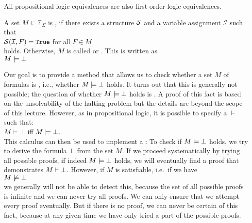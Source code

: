 \remarkEng
All propositional logic equivalences are also first-order logic equivalences.
\eox

\begin{Definition}[Satisfiable]
    A set $M \subseteq \mathbb{F}_\Sigma$ is ,
    if there exists a structure $\mathcal{S}$ and a variable assignment $\mathcal{I}$ such that 
    \\[0.2cm]
    \hspace*{1.3cm}
    $\mathcal{S}(\mathcal{I},F) = \mathtt{True}$ \quad for all $F \in M$ 
    \\[0.2cm]
    holds. Otherwise, $M$ is called  or .
    This is written as \\[0.2cm]
    \hspace*{1.3cm} $M \models \bot$ 
    \eox
\end{Definition}

\noindent
Our goal is to provide a method that allows us to check
whether a set $M$ of formulas is , i.e., whether 
$M \models \bot$ holds. It turns out that this is generally not
possible; the question of whether $M \models \bot$ holds is . A proof
of this fact is based on the unsolvability of the halting problem but the details are beyond the scope of
this lecture. 
However, as in propositional logic, it is possible
to specify a  $\vdash$ such that: \\[0.2cm]
\hspace*{1.3cm} $M \vdash \bot$ \quad iff \quad $M \models \bot$. \\[0.2cm]
This calculus can then be used to implement a
: To check if
$M \models \bot$ holds, we try to derive the formula $\bot$
from the set $M$.
If we proceed systematically by trying all possible proofs,
if indeed $M \models \bot$ holds, we will eventually find a proof
that demonstrates $M \vdash \bot$. However, if $M$ is satisfiable, i.e.~if we have  \\[0.2cm]
\hspace*{1.3cm}  $M \not\models \bot$ \\[0.2cm]
we generally will not be able to detect this, because the set of all possible proofs is infinite
and we can never try all proofs. We can only ensure that
we attempt every proof eventually. But if there is no proof, we can
never be certain of this fact, because at any given time we have only tried a part of the
possible proofs.

